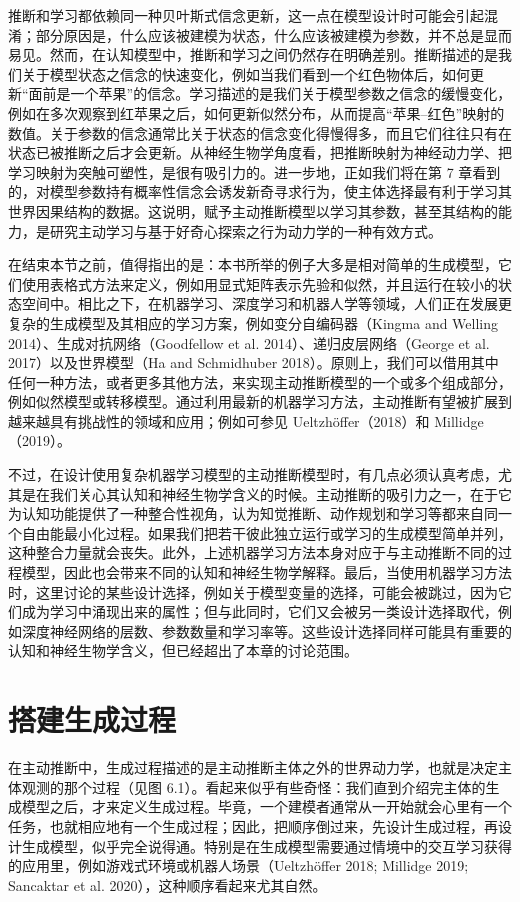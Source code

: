 推断和学习都依赖同一种贝叶斯式信念更新，这一点在模型设计时可能会引起混淆；部分原因是，什么应该被建模为状态，什么应该被建模为参数，并不总是显而易见。然而，在认知模型中，推断和学习之间仍然存在明确差别。推断描述的是我们关于模型状态之信念的快速变化，例如当我们看到一个红色物体后，如何更新“面前是一个苹果”的信念。学习描述的是我们关于模型参数之信念的缓慢变化，例如在多次观察到红苹果之后，如何更新似然分布，从而提高“苹果--红色”映射的数值。关于参数的信念通常比关于状态的信念变化得慢得多，而且它们往往只有在状态已被推断之后才会更新。从神经生物学角度看，把推断映射为神经动力学、把学习映射为突触可塑性，是很有吸引力的。进一步地，正如我们将在第 7 章看到的，对模型参数持有概率性信念会诱发新奇寻求行为，使主体选择最有利于学习其世界因果结构的数据。这说明，赋予主动推断模型以学习其参数，甚至其结构的能力，是研究主动学习与基于好奇心探索之行为动力学的一种有效方式。

在结束本节之前，值得指出的是：本书所举的例子大多是相对简单的生成模型，它们使用表格式方法来定义，例如用显式矩阵表示先验和似然，并且运行在较小的状态空间中。相比之下，在机器学习、深度学习和机器人学等领域，人们正在发展更复杂的生成模型及其相应的学习方案，例如变分自编码器（Kingma and Welling 2014）、生成对抗网络（Goodfellow et al. 2014）、递归皮层网络（George et al. 2017）以及世界模型（Ha and Schmidhuber 2018）。原则上，我们可以借用其中任何一种方法，或者更多其他方法，来实现主动推断模型的一个或多个组成部分，例如似然模型或转移模型。通过利用最新的机器学习方法，主动推断有望被扩展到越来越具有挑战性的领域和应用；例如可参见 Ueltzhöffer（2018）和 Millidge（2019）。

不过，在设计使用复杂机器学习模型的主动推断模型时，有几点必须认真考虑，尤其是在我们关心其认知和神经生物学含义的时候。主动推断的吸引力之一，在于它为认知功能提供了一种整合性视角，认为知觉推断、动作规划和学习等都来自同一个自由能最小化过程。如果我们把若干彼此独立运行或学习的生成模型简单并列，这种整合力量就会丧失。此外，上述机器学习方法本身对应于与主动推断不同的过程模型，因此也会带来不同的认知和神经生物学解释。最后，当使用机器学习方法时，这里讨论的某些设计选择，例如关于模型变量的选择，可能会被跳过，因为它们成为学习中涌现出来的属性；但与此同时，它们又会被另一类设计选择取代，例如深度神经网络的层数、参数数量和学习率等。这些设计选择同样可能具有重要的认知和神经生物学含义，但已经超出了本章的讨论范围。

\section{搭建生成过程}

在主动推断中，生成过程描述的是主动推断主体之外的世界动力学，也就是决定主体观测的那个过程（见图 6.1）。看起来似乎有些奇怪：我们直到介绍完主体的生成模型之后，才来定义生成过程。毕竟，一个建模者通常从一开始就会心里有一个任务，也就相应地有一个生成过程；因此，把顺序倒过来，先设计生成过程，再设计生成模型，似乎完全说得通。特别是在生成模型需要通过情境中的交互学习获得的应用里，例如游戏式环境或机器人场景（Ueltzhöffer 2018; Millidge 2019; Sancaktar et al. 2020），这种顺序看起来尤其自然。

